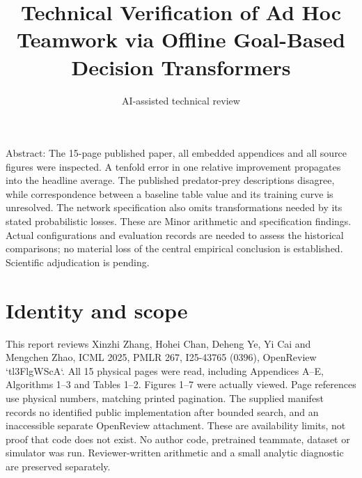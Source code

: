 \documentclass[10pt]{article}
\title{Technical Verification of Ad Hoc Teamwork via Offline Goal-Based Decision Transformers}
\author{AI-assisted technical review}
\date{}
\begin{document}
\maketitle
Abstract: The 15-page published paper, all embedded appendices and all source figures were inspected. A tenfold error in one relative improvement propagates into the headline average. The published predator-prey descriptions disagree, while correspondence between a baseline table value and its training curve is unresolved. The network specification also omits transformations needed by its stated probabilistic losses. These are Minor arithmetic and specification findings. Actual configurations and evaluation records are needed to assess the historical comparisons; no material loss of the central empirical conclusion is established. Scientific adjudication is pending.\par
\section*{Identity and scope}
This report reviews Xinzhi Zhang, Hohei Chan, Deheng Ye, Yi Cai and Mengchen Zhao, ICML 2025, PMLR 267, I25-43765 (0396), OpenReview `tl3FlgWScA`. All 15 physical pages were read, including Appendices A–E, Algorithms 1–3 and Tables 1–2. Figures 1–7 were actually viewed. Page references use physical numbers, matching printed pagination. The supplied manifest records no identified public implementation after bounded search, and an inaccessible separate OpenReview attachment. These are availability limits, not proof that code does not exist. No author code, pretrained teammate, dataset or simulator was run. Reviewer-written arithmetic and a small analytic diagnostic are preserved separately.\par
\end{document}
